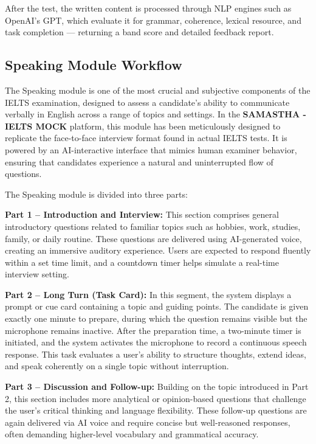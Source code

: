 \documentclass[a4paper,12pt]{article}
\begin{document}
After the test, the written content is processed through NLP engines such as OpenAI’s GPT, which evaluate it for grammar, coherence, lexical resource, and task completion — returning a band score and detailed feedback report.

\vspace{0.5cm}

\subsection{Speaking Module Workflow}

The Speaking module is one of the most crucial and subjective components of the IELTS examination, designed to assess a candidate’s ability to communicate verbally in English across a range of topics and settings. In the \textbf{SAMASTHA - IELTS MOCK} platform, this module has been meticulously designed to replicate the face-to-face interview format found in actual IELTS tests. It is powered by an AI-interactive interface that mimics human examiner behavior, ensuring that candidates experience a natural and uninterrupted flow of questions.

The Speaking module is divided into three parts:

\textbf{Part 1 – Introduction and Interview:} This section comprises general introductory questions related to familiar topics such as hobbies, work, studies, family, or daily routine. These questions are delivered using AI-generated voice, creating an immersive auditory experience. Users are expected to respond fluently within a set time limit, and a countdown timer helps simulate a real-time interview setting.

\textbf{Part 2 – Long Turn (Task Card):} In this segment, the system displays a prompt or cue card containing a topic and guiding points. The candidate is given exactly one minute to prepare, during which the question remains visible but the microphone remains inactive. After the preparation time, a two-minute timer is initiated, and the system activates the microphone to record a continuous speech response. This task evaluates a user’s ability to structure thoughts, extend ideas, and speak coherently on a single topic without interruption.

\textbf{Part 3 – Discussion and Follow-up:} Building on the topic introduced in Part 2, this section includes more analytical or opinion-based questions that challenge the user’s critical thinking and language flexibility. These follow-up questions are again delivered via AI voice and require concise but well-reasoned responses, often demanding higher-level vocabulary and grammatical accuracy.
\end{document}
